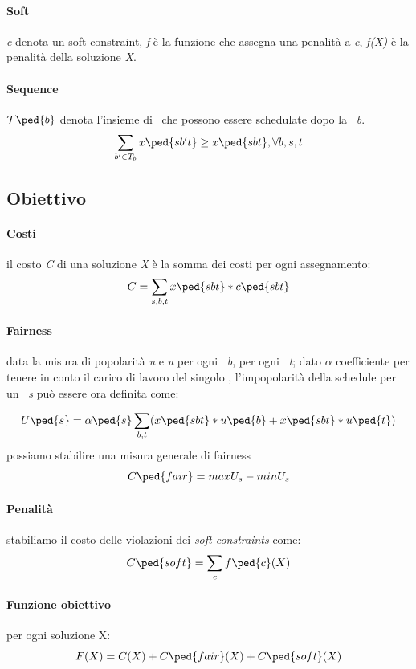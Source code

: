         \paragraph{Soft} \textit{c} denota un soft constraint, \textit{f} è la funzione che assegna una penalità a \textit{c}, \textit{f(X)} è la penalità della soluzione \textit{X}.
        \paragraph{Sequence} $\mathcal{T}\ped{b}$ denota l'insieme di \ttb\ che possono essere schedulate dopo la \ttb\ \textit{b}. \[\sum_{b'\in T_b} x\ped{sb't} \ge x\ped{sbt}, \forall b,s,t\]
    \subsection{Obiettivo}
        \paragraph{Costi} il costo \textit{C} di una soluzione \textit{X} è la somma dei costi per ogni assegnamento: \[C=\sum_{s,b,t} x\ped{sbt}*c\ped{sbt}\]
        \paragraph{Fairness} data la misura di popolarità \textit{u} e \textit{u} per ogni \ttb\ \textit{b}, per ogni \task\ \textit{t}; dato \textit{$\alpha$} coefficiente per tenere in conto il carico di lavoro del singolo \items, l'impopolarità della schedule per un \items\ \textit{s} può essere ora definita come:
        
        \[U\ped{s}=\alpha \ped{s} \sum_{b,t}( x\ped{sbt}*u\ped{b} + x\ped{sbt}*u\ped{t})\]
        possiamo stabilire una misura generale di fairness
        \[C\ped{fair}= max U_s - minU_s\]
        \paragraph{Penalità} stabiliamo il costo delle violazioni dei \textit{soft constraints} come:
        \[C\ped{soft}=\sum_{c} f\ped{c}(X)\]
        \paragraph{Funzione obiettivo} per ogni soluzione X:
        \[F(X)= C(X) + C\ped{fair}(X) + C\ped{soft}(X)\]
